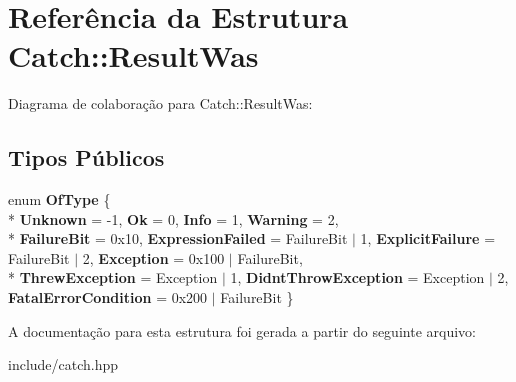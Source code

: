 \hypertarget{structCatch_1_1ResultWas}{}\section{Referência da Estrutura Catch\+:\+:Result\+Was}
\label{structCatch_1_1ResultWas}


Diagrama de colaboração para Catch\+:\+:Result\+Was\+:
\subsection*{Tipos Públicos}
\begin{DoxyCompactItemize}
\item 
enum {\bfseries Of\+Type} \{ \\*
{\bfseries Unknown} = -\/1, 
{\bfseries Ok} = 0, 
{\bfseries Info} = 1, 
{\bfseries Warning} = 2, 
\\*
{\bfseries Failure\+Bit} = 0x10, 
{\bfseries Expression\+Failed} = Failure\+Bit $\vert$ 1, 
{\bfseries Explicit\+Failure} = Failure\+Bit $\vert$ 2, 
{\bfseries Exception} = 0x100 $\vert$ Failure\+Bit, 
\\*
{\bfseries Threw\+Exception} = Exception $\vert$ 1, 
{\bfseries Didnt\+Throw\+Exception} = Exception $\vert$ 2, 
{\bfseries Fatal\+Error\+Condition} = 0x200 $\vert$ Failure\+Bit
 \}\hypertarget{structCatch_1_1ResultWas_a624e1ee3661fcf6094ceef1f654601ef}{}\label{structCatch_1_1ResultWas_a624e1ee3661fcf6094ceef1f654601ef}

\end{DoxyCompactItemize}


A documentação para esta estrutura foi gerada a partir do seguinte arquivo\+:\begin{DoxyCompactItemize}
\item 
include/catch.\+hpp\end{DoxyCompactItemize}
